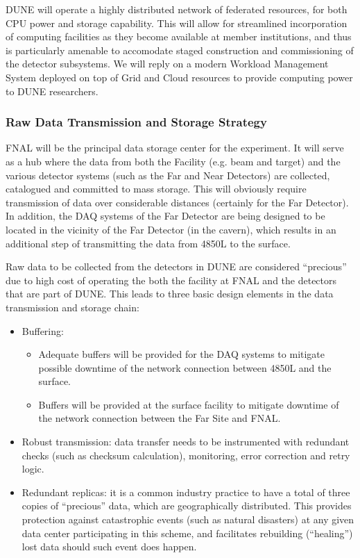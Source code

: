 DUNE will operate a highly distributed network of federated resources, for both CPU power and storage capability. This will allow for streamlined incorporation of computing facilities
as they become available at member institutions, and thus is particularly amenable to accomodate staged construction and commissioning of the detector subsystems. We will reply
on a modern Workload Management System deployed on top of Grid and Cloud resources to provide computing power to DUNE researchers.

\subsubsection{Raw Data Transmission and Storage Strategy}
FNAL will be the principal data storage center for the experiment. It will serve as a hub where the data from both the Facility (e.g. beam and target)
and the various detector systems (such as the  Far and Near Detectors)  are collected, catalogued and committed to mass storage. This will obviously require transmission of
data over considerable distances (certainly for the Far Detector). In addition, the DAQ systems of the Far Detector are being designed to be located  in the vicinity of
the Far Detector (in the cavern), which results in an additional step of transmitting the data from 4850L to the surface.

Raw data to be collected from the detectors in DUNE are considered ``precious'' due to high cost of operating the both the facility at FNAL
and the detectors that are part of DUNE. This leads to three basic design elements in the data transmission and storage chain:
\begin{itemize}
\item Buffering:
\begin{itemize}
\item Adequate buffers will be provided for the DAQ systems  to mitigate possible downtime of the network connection between 4850L and the surface.
\item Buffers will be provided at the surface facility to mitigate downtime of the network connection between the Far Site and FNAL.
\end{itemize}
\item Robust transmission: data transfer needs to be instrumented with redundant checks (such as checksum calculation), monitoring, error correction and retry logic.
\item Redundant replicas: it is a common industry practice to have a total of three copies of ``precious'' data, which are geographically distributed. This provides protection against catastrophic events (such as natural disasters) at any given data center participating in this scheme, and facilitates rebuilding (``healing'')  lost data should such event does happen.
\end{itemize}



